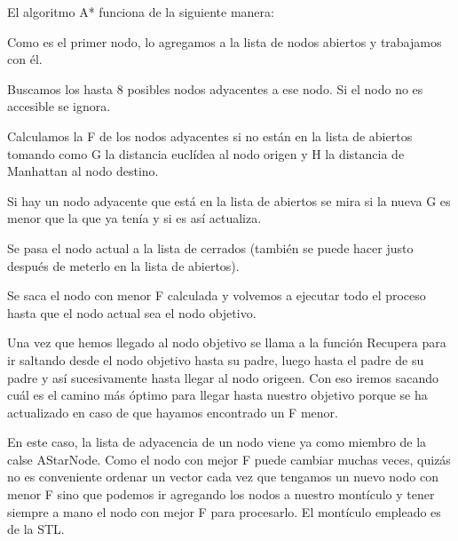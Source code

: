 El algoritmo A* funciona de la siguiente manera:
\begin{list}{-}{}
    \item Como es el primer nodo, lo agregamos a la lista de nodos abiertos y trabajamos con él.
    \item Buscamos los hasta 8 posibles nodos adyacentes a ese nodo. Si el nodo no es accesible se ignora.
    \item Calculamos la F de los nodos adyacentes si no están en la lista de abiertos tomando como G la distancia euclídea al nodo origen y H la distancia de Manhattan al nodo destino.
    \item Si hay un nodo adyacente que está en la lista de abiertos se mira si la nueva G es menor que la que ya tenía y si es así actualiza.
    \item Se pasa el nodo actual a la lista de cerrados (también se puede hacer justo después de meterlo en la lista de abiertos).
    \item Se saca el nodo con menor F calculada y volvemos a ejecutar todo el proceso hasta que el nodo actual sea el nodo objetivo.
    \item Una vez que hemos llegado al nodo objetivo se llama a la función Recupera para ir saltando desde el nodo objetivo hasta su padre, luego hasta el padre de su padre y así sucesivamente hasta llegar al nodo origeen. Con eso iremos sacando cuál es el camino más óptimo para llegar hasta nuestro objetivo porque se ha actualizado en caso de que hayamos encontrado un F menor.
\end{list}

En este caso, la lista de adyacencia de un nodo viene ya como miembro de la calse AStarNode.
Como el nodo con mejor F puede cambiar muchas veces, quizás no es conveniente ordenar un vector cada vez que tengamos un nuevo nodo con menor F sino que podemos ir agregando los nodos a nuestro montículo y tener siempre a mano el nodo con mejor F para procesarlo. El montículo empleado es de la STL.